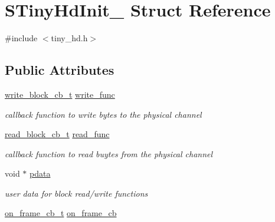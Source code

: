 \hypertarget{structSTinyHdInit__}{}\section{S\+Tiny\+Hd\+Init\+\_\+ Struct Reference}
\label{structSTinyHdInit__}


{\ttfamily \#include $<$tiny\+\_\+hd.\+h$>$}

\subsection*{Public Attributes}
\begin{DoxyCompactItemize}
\item 
\mbox{\label{structSTinyHdInit___a0bd05a4fc43236ff37d67aec4d2a0952}} 
\hyperlink{tiny__proto__types_8h_a7f69e669de5baa69a43ee5cb439a7496}{write\+\_\+block\+\_\+cb\+\_\+t} \hyperlink{structSTinyHdInit___a0bd05a4fc43236ff37d67aec4d2a0952}{write\+\_\+func}
\begin{DoxyCompactList}\small\item\em callback function to write bytes to the physical channel \end{DoxyCompactList}\item 
\mbox{\label{structSTinyHdInit___a5de352b11ca7915737bc459cde7c566d}} 
\hyperlink{tiny__proto__types_8h_ae3d867e030f59de94508902f2b84a7ec}{read\+\_\+block\+\_\+cb\+\_\+t} \hyperlink{structSTinyHdInit___a5de352b11ca7915737bc459cde7c566d}{read\+\_\+func}
\begin{DoxyCompactList}\small\item\em callback function to read buytes from the physical channel \end{DoxyCompactList}\item 
\mbox{\label{structSTinyHdInit___a7b6be4e09ea04eaa4372eadce4d51055}} 
void $\ast$ \hyperlink{structSTinyHdInit___a7b6be4e09ea04eaa4372eadce4d51055}{pdata}
\begin{DoxyCompactList}\small\item\em user data for block read/write functions \end{DoxyCompactList}\item 
\mbox{\label{structSTinyHdInit___ae2eea5181620dfbb47b60a5073bd5ed2}} 
\hyperlink{tiny__proto__types_8h_ad6bf709565b8aecb9e6ecf196f219d54}{on\+\_\+frame\+\_\+cb\+\_\+t} \hyperlink{structSTinyHdInit___ae2eea5181620dfbb47b60a5073bd5ed2}{on\+\_\+frame\+\_\+cb}

\end{DoxyCompactItemize}
